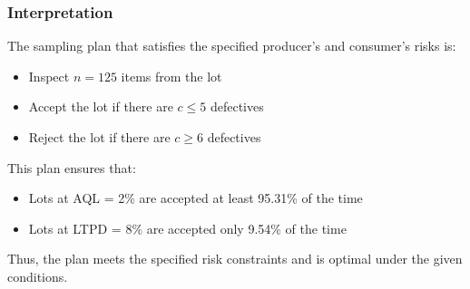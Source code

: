 \documentclass[twoside]{book}
\begin{document}
\subsubsection*{Interpretation}
The sampling plan that satisfies the specified producer's and consumer's risks is:
\begin{itemize}
    \item Inspect $n = 125$ items from the lot
    \item Accept the lot if there are $c \leq 5$ defectives
    \item Reject the lot if there are $c \geq 6$ defectives
\end{itemize}

This plan ensures that:
\begin{itemize}
    \item Lots at AQL = 2\% are accepted at least 95.31\% of the time
    \item Lots at LTPD = 8\% are accepted only 9.54\% of the time
\end{itemize}

Thus, the plan meets the specified risk constraints and is optimal under the given conditions.
\end{document}
